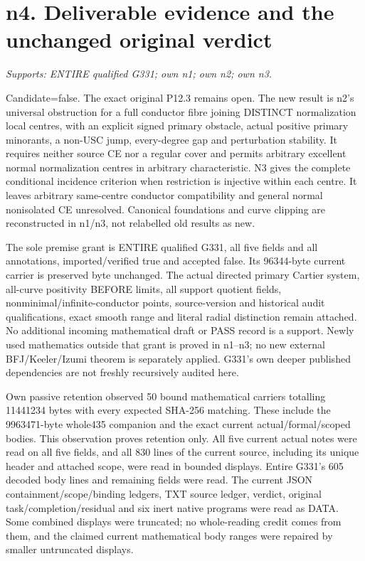 \section{n4. Deliverable evidence and the unchanged original verdict}
\textit{Supports: ENTIRE qualified G331; own n1; own n2; own n3.}

Candidate=false. The exact original P12.3 remains open. The new result is
n2's universal obstruction for a full conductor fibre joining DISTINCT
normalization local centres, with an explicit signed primary obstacle,
actual positive primary minorants, a non-USC jump, every-degree gap and
perturbation stability. It requires neither source CE nor a regular cover
and permits arbitrary excellent normal normalization centres in arbitrary
characteristic. N3 gives the complete conditional incidence criterion
when restriction is injective within each centre. It leaves arbitrary
same-centre conductor compatibility and general normal nonisolated CE
unresolved. Canonical foundations and curve clipping are reconstructed
in n1/n3, not relabelled old results as new.

The sole premise grant is ENTIRE qualified G331, all five fields and all
annotations, imported/verified true and accepted false. Its 96344-byte
current carrier is preserved byte unchanged. The actual directed primary
Cartier system, all-curve positivity BEFORE limits, all support quotient
fields, nonminimal/infinite-conductor points, source-version and historical
audit qualifications, exact smooth range and literal radial distinction
remain attached. No additional incoming mathematical draft or PASS record
is a support. Newly used mathematics outside that grant is proved in
n1--n3; no new external BFJ/Keeler/Izumi theorem is separately applied.
G331's own deeper published dependencies are not freshly recursively
audited here.

Own passive retention observed 50 bound mathematical carriers totalling
11441234 bytes with every expected SHA-256 matching. These include the
9963471-byte whole435 companion and the exact current actual/formal/scoped
bodies. This observation proves retention only. All five current actual
notes were read on all five fields, and all 830 lines of the current source,
including its unique header and attached scope, were read in bounded
displays. Entire G331's 605 decoded body lines and remaining fields were
read. The current JSON containment/scope/binding ledgers, TXT source ledger,
verdict, original task/completion/residual and six inert native programs
were read as DATA. Some combined displays were truncated; no whole-reading
credit comes from them, and the claimed current mathematical body ranges
were repaired by smaller untruncated displays.

